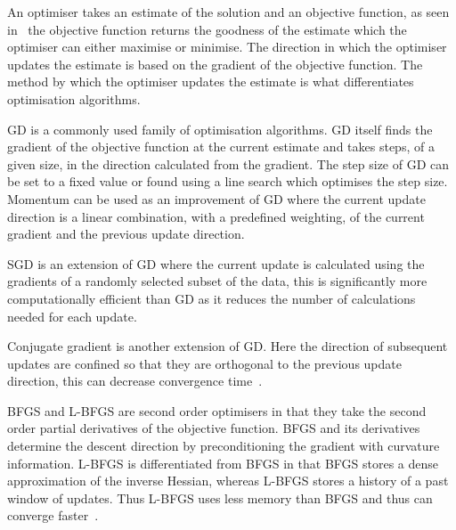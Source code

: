                 An optimiser takes an estimate of the solution and an objective function, as seen in~ the objective function returns the goodness of the estimate which the optimiser can either maximise or minimise. The direction in which the optimiser updates the estimate is based on the gradient of the objective function. The method by which the optimiser updates the estimate is what differentiates optimisation algorithms.
                
                \gls{GD} is a commonly used family of optimisation algorithms. \gls{GD} itself finds the gradient of the objective function at the current estimate %
                and takes steps, of a given size,  in the direction calculated from the gradient. %
                The step size of \gls{GD} can be set to a fixed value or found using a line search which optimises the step size. Momentum can be used as an improvement of \gls{GD} where the current update direction is a linear combination, with a predefined weighting, of the current gradient and the previous update direction.
                
                \gls{SGD} is an extension of \gls{GD} where the current update is calculated using the gradients of a randomly selected subset of the data, %
                this is significantly more computationally efficient than \gls{GD} as it reduces the number of calculations needed for each update.
                
                Conjugate gradient is another extension of \gls{GD}. Here the direction of subsequent updates are confined so that they are orthogonal to the previous update direction, this can decrease convergence time~\parencite{Tustison2009}. %
                
                \gls{BFGS} and \gls{L-BFGS} are second order optimisers in that they take the second order partial derivatives of the objective function. \gls{BFGS} and its derivatives determine the descent direction by preconditioning the gradient with curvature information. \gls{L-BFGS} is differentiated from \gls{BFGS} in that \gls{BFGS} stores a dense approximation of the inverse Hessian, whereas \gls{L-BFGS} stores a history of a past window of updates. Thus \gls{L-BFGS} uses less memory than \gls{BFGS} and thus can converge faster~\parencite{Fletcher2000PracticalOptimization}.
                
